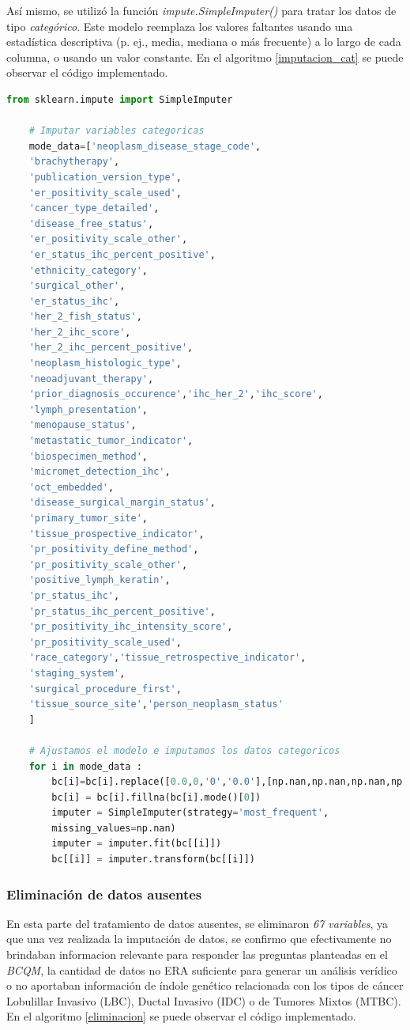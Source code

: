  Así mismo, se utilizó la función \textit{impute.SimpleImputer()} para tratar los datos de tipo \textit{categórico}. Este modelo reemplaza los valores faltantes usando una estadística descriptiva (p. ej., media, mediana o más frecuente) a lo largo de cada columna, o usando un valor constante. En el algoritmo \ref{imputacion_cat} se puede observar el código implementado.
  
   \begin{lstlisting}[basicstyle=\scriptsize,language=Python, label=imputacion_cat, caption=Imputar datos categóricos con sklearn en Python.]
  	from sklearn.impute import SimpleImputer
  	
	# Imputar variables categoricas
	mode_data=['neoplasm_disease_stage_code',
	'brachytherapy',
	'publication_version_type',
	'er_positivity_scale_used',
	'cancer_type_detailed',
	'disease_free_status',
	'er_positivity_scale_other',
	'er_status_ihc_percent_positive',
	'ethnicity_category',
	'surgical_other',
	'er_status_ihc',
	'her_2_fish_status',
	'her_2_ihc_score',
	'her_2_ihc_percent_positive',
	'neoplasm_histologic_type',
	'neoadjuvant_therapy',
	'prior_diagnosis_occurence','ihc_her_2','ihc_score',
	'lymph_presentation',
	'menopause_status',
	'metastatic_tumor_indicator',
	'biospecimen_method',
	'micromet_detection_ihc',
	'oct_embedded',
	'disease_surgical_margin_status',
	'primary_tumor_site',
	'tissue_prospective_indicator',
	'pr_positivity_define_method',
	'pr_positivity_scale_other',
	'positive_lymph_keratin',
	'pr_status_ihc',
	'pr_status_ihc_percent_positive',
	'pr_positivity_ihc_intensity_score',
	'pr_positivity_scale_used',
	'race_category','tissue_retrospective_indicator',
	'staging_system',
	'surgical_procedure_first',
	'tissue_source_site','person_neoplasm_status'
	]
  		
  	# Ajustamos el modelo e imputamos los datos categoricos
  	for i in mode_data :
	  	bc[i]=bc[i].replace([0.0,0,'0','0.0'],[np.nan,np.nan,np.nan,np.nan])
	  	bc[i] = bc[i].fillna(bc[i].mode()[0])
	  	imputer = SimpleImputer(strategy='most_frequent', 
	  	missing_values=np.nan)
	  	imputer = imputer.fit(bc[[i]])
	  	bc[[i]] = imputer.transform(bc[[i]])
  \end{lstlisting}
 
 
\subsubsection{Eliminación de datos ausentes}

En esta parte del tratamiento de datos ausentes, se eliminaron \textit{67 variables}, ya que una vez realizada la imputación de datos, se confirmo que efectivamente no brindaban informacion relevante para responder las preguntas planteadas en el \textit{BCQM}, la cantidad de datos no ERA suficiente para generar un análisis verídico o  no aportaban información de índole genético relacionada con los tipos de cáncer Lobulillar Invasivo (LBC), Ductal Invasivo (IDC) o de Tumores Mixtos (MTBC). En el algoritmo \ref{eliminacion} se puede observar el código implementado.
 
